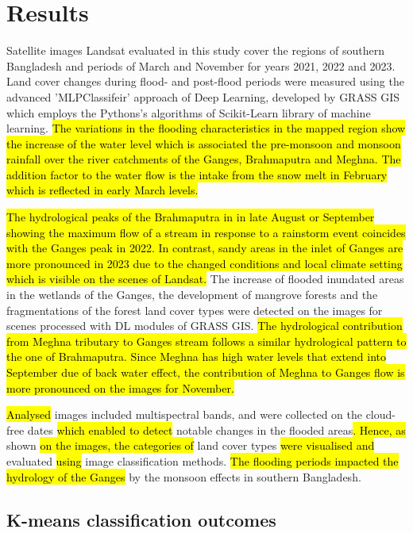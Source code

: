 \documentclass[water,article,submit,pdftex,moreauthors]{Definitions/mdpi}
\begin{document}
\section{Results}

Satellite images Landsat evaluated in this study cover the regions of southern Bangladesh and\hl{ }periods of March and November for years 2021, 2022 and 2023. Land cover changes during flood- and post-flood periods were measured using the advanced 'MLPClassifeir' approach of Deep Learning, developed by GRASS GIS which employs the Pythons's algorithms of Scikit-Learn library of machine learning. \hl{The variations in the flooding characteristics in the mapped region show the increase of the water level which is associated the pre-monsoon and monsoon rainfall over the river catchments of the Ganges, Brahmaputra and Meghna. The addition factor to the water flow is the intake from the snow melt in February which is reflected in early March levels.} 

\hl{The hydrological peaks of the Brahmaputra in  in late August or September showing the maximum flow of a stream in response to a rainstorm event coincides with the Ganges peak in 2022. In contrast, sandy areas in the inlet of Ganges are more pronounced in 2023 due to the changed conditions and local climate setting which is visible on the scenes of Landsat. }The increase of flooded inundated areas in the wetlands of the Ganges, the development of mangrove forests and the fragmentations of the forest land cover types were detected on the images for scenes processed with DL modules of GRASS GIS. \hl{The hydrological contribution from Meghna tributary to Ganges stream follows a similar hydrological pattern to the one of Brahmaputra. Since Meghna has high water levels that extend into September due of back water effect, the contribution of Meghna to Ganges flow is more pronounced on the images for November.}

\hl{Analysed} images included multispectral bands, and were collected on the cloud-free dates \hl{which enabled to detect} notable changes in the flooded areas\hl{. Hence, as} shown \hl{on the images, the categories of} land cover types \hl{were visualised and }evaluated \hl{using} image classification methods. \hl{The flooding periods impacted the hydrology of the Ganges} by the monsoon effects in southern Bangladesh.

\subsection{K-means classification outcomes}
\end{document}

